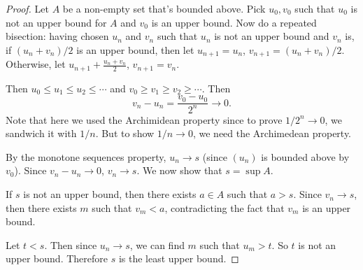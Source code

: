 \documentclass[a4paper]{article}
\begin{document}
\begin{proof}
  Let $A$ be a non-empty set that's bounded above. Pick $u_0, v_0$ such that $u_0$ is not an upper bound for $A$ and $v_0$ is an upper bound. Now do a repeated bisection: having chosen $u_n$ and $v_n$ such that $u_n$ is not an upper bound and $v_n$ is, if $(u_n + v_n)/2$ is an upper bound, then let $u_{n + 1} = u_n$, $v_{n + 1} = (u_n + v_n)/2$. Otherwise, let $u_{n + 1} + \frac{u_n + v_n}{2}$, $v_{n + 1} = v_n$.

  Then $u_0 \leq u_1 \leq u_2 \leq \cdots$ and $v_0\geq v_1 \geq v_2 \geq \cdots$. Then 
  \[
    v_n - u_n = \frac{v_0 - u_0}{2^n} \to 0.
  \]
  Note that here we used the Archimidean property since to prove $1/2^n \to 0$, we sandwich it with $1/n$. But to show $1/n\to 0$, we need the Archimedean property.

  By the monotone sequences property, $u_n\to s$ (since $(u_n)$ is bounded above by $v_0$). Since $v_n - u_n \to 0$, $v_n \to s$. We now show that $s = \sup A$.

  If $s$ is not an upper bound, then there exists $a\in A$ such that $a > s$. Since $v_n \to s$, then there exists $m$ such that $v_m < a$, contradicting the fact that $v_m$ is an upper bound.

  Let $t < s$. Then since $u_n \to s$, we can find $m$ such that $u_m > t$. So $t$ is not an upper bound. Therefore $s$ is the least upper bound.
\end{proof}
\end{document}
